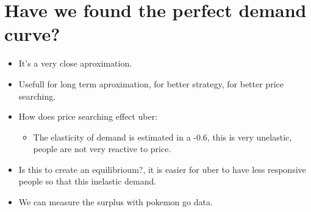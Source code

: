 \documentclass{article}
\begin{document}

\section{Have we found the perfect demand curve?}
\begin{itemize}
    \item It's a very close aproximation.
    \item Usefull for long term aproximation, for better strategy, for better price searching.
    \item How does price searching effect uber:
        \begin{itemize}
            \item The elasticity of demand is estimated in a -0.6, this is very unelastic, people are not very reactive to price.
        \end{itemize}
    
    \item Is this to create an equilibrioum?, it is easier for uber to have less responsive people so that this inelastic demand.
    \item We can measure the surplus with pokemon go data.
\end{itemize}
\end{document}
